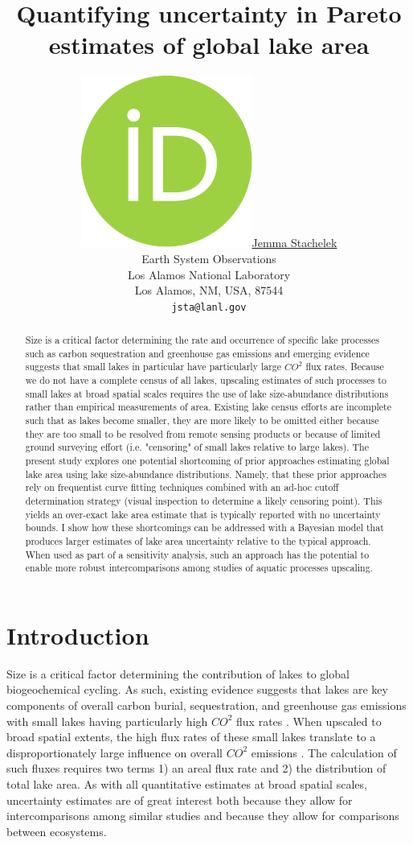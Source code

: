 \documentclass{article}
\title{Quantifying uncertainty in Pareto estimates of global lake area}
\date{} 					%
\author{ \href{https://orcid.org/0000-0002-5924-2464}{\includegraphics[scale=0.06]{orcid.pdf}\hspace{1mm}Jemma Stachelek} \\
	Earth System Observations\\
	Los Alamos National Laboratory\\
	Los Alamos, NM, USA, 87544 \\
	\texttt{jsta@lanl.gov} \\
}
\begin{document}
\maketitle

\begin{abstract}
	Size is a critical factor determining the rate and occurrence of specific lake processes such as carbon sequestration and greenhouse gas emissions and emerging evidence suggests that small lakes in particular have particularly large $CO^2$ flux rates. Because we do not have a complete census of all lakes, upscaling estimates of such processes to small lakes at broad spatial scales requires the use of lake size-abundance distributions rather than empirical measurements of area. Existing lake census efforts are incomplete such that as lakes become smaller, they are more likely to be omitted either because they are too small to be resolved from remote sensing products or because of limited ground surveying effort (i.e. "censoring" of small lakes relative to large lakes). The present study explores one potential shortcoming of prior approaches estimating global lake area using lake size-abundance distributions. Namely, that these prior approaches rely on frequentist curve fitting techniques combined with an ad-hoc cutoff determination strategy (visual inspection to determine a likely censoring point). This yields an over-exact lake area estimate that is typically reported with no uncertainty bounds. I show how these shortcomings can be addressed with a Bayesian model that produces larger estimates of lake area uncertainty relative to the typical approach. When used as part of a sensitivity analysis, such an approach has the potential to enable more robust intercomparisons among studies of aquatic processes upscaling.
\end{abstract}

\section{Introduction}
Size is a critical factor determining the contribution of lakes to global biogeochemical cycling. As such, existing evidence suggests that lakes are key components of overall carbon burial, sequestration, and greenhouse gas emissions with small lakes having particularly high $CO^2$ flux rates \citep{delsontroGreenhouseGasEmissions2018, kellerGlobalCarbonBudget2021}. When upscaled to broad spatial extents, the high flux rates of these small lakes translate to a disproportionately large influence on overall $CO^2$ emissions \citep{piMappingGlobalLake2022}. The calculation of such fluxes requires two terms 1) an areal flux rate and 2) the distribution of total lake area. As with all quantitative estimates at broad spatial scales, uncertainty estimates are of great interest both because they allow for intercomparisons among similar studies and because they allow for comparisons between ecosystems.
\end{document}
